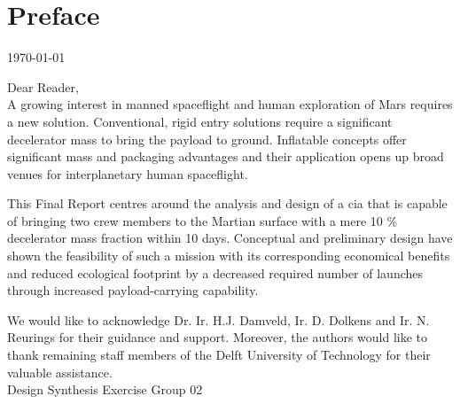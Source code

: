 \section*{Preface}\label{cha:preface}

\begin{flushright}
	\today
\end{flushright}

Dear Reader,	
\\ [1cm]
A growing interest in manned spaceflight and human exploration of Mars requires a new solution. Conventional, rigid entry solutions require a significant decelerator mass to bring the payload to ground. Inflatable concepts offer significant mass and packaging advantages and their application opens up broad venues for interplanetary human spaceflight. 

This Final Report centres around the analysis and design of a \acrlong{cia} that is capable of bringing two crew members to the Martian surface with a mere 10 \% decelerator mass fraction within 10 days. Conceptual and preliminary design have shown the feasibility of such a mission with its corresponding economical benefits and reduced ecological footprint by a decreased required number of launches through increased payload-carrying capability.

We would like to acknowledge Dr. Ir. H.J. Damveld, Ir. D. Dolkens and Ir. N. Reurings for their guidance and support. Moreover, the authors would like to thank remaining staff members of the Delft University of Technology for their valuable assistance.
\\ [1.5cm]
Design Synthesis Exercise Group 02

